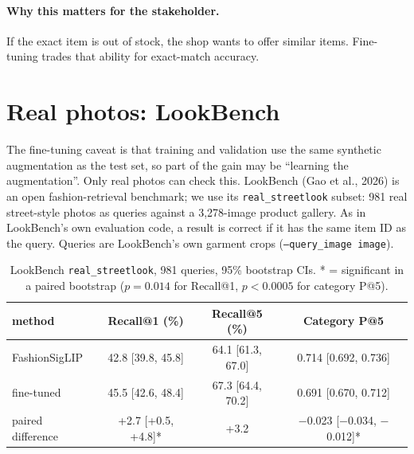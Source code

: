 \documentclass[11pt,a4paper]{article}
\begin{document}
\paragraph{Why this matters for the stakeholder.} If the exact item is out of stock, the shop wants
to offer similar items. Fine-tuning trades that ability for exact-match accuracy.

\section{Real photos: LookBench}\label{sec:lookbench}

The fine-tuning caveat is that training and validation use the same synthetic augmentation as the test
set, so part of the gain may be ``learning the augmentation''. Only real photos can check this.
LookBench (Gao et al., 2026) is an open fashion-retrieval benchmark; we use its \texttt{real\_streetlook}
subset: 981 real street-style photos as queries against a 3,278-image product gallery. As in
LookBench's own evaluation code, a result is correct if it has the same item ID as the query. Queries
are LookBench's own garment crops (\texttt{--query\_image image}).

\begin{table}[H]
\centering
\begin{tabular}{lccc}
\toprule
method & Recall@1 (\%) & Recall@5 (\%) & Category P@5 \\
\midrule
FashionSigLIP & 42.8 [39.8, 45.8] & 64.1 [61.3, 67.0] & 0.714 [0.692, 0.736] \\
fine-tuned    & 45.5 [42.6, 48.4] & 67.3 [64.4, 70.2] & 0.691 [0.670, 0.712] \\
\midrule
paired difference & +2.7 [+0.5, +4.8]* & +3.2 & $-$0.023 [$-$0.034, $-$0.012]* \\
\bottomrule
\end{tabular}
\caption{LookBench \texttt{real\_streetlook}, 981 queries, 95\% bootstrap CIs.
* = significant in a paired bootstrap ($p=0.014$ for Recall@1, $p<0.0005$ for category P@5).}
\end{table}
\end{document}
